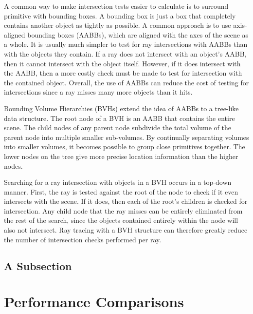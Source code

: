 \documentclass{sig-alternate}
\begin{document}
A common way to make intersection tests easier to calculate is to surround primitive with bounding boxes. A bounding box is just a box that completely contains another object as tightly as possible. A common approach is to use axis-aligned bounding boxes (AABBs), which are aligned with the axes of the scene as a whole. It is usually much simpler to test for ray intersections with AABBs than with the objects they contain. If a ray does not intersect with an object's AABB, then it cannot intersect with the object itself. However, if it does intersect with the AABB, then a more costly check must be made to test for intersection with the contained object. Overall, the use of AABBs can reduce the cost of testing for intersections since a ray misses many more objects than it hits.

Bounding Volume Hierarchies (BVHs) extend the idea of AABBs to a tree-like data structure. The root node of a BVH is an AABB that contains the entire scene. The child nodes of any parent node subdivide the total volume of the parent node into multiple smaller sub-volumes. By continually separating volumes into smaller volumes, it becomes possible to group close primitives together. The lower nodes on the tree give more precise location information than the higher nodes.

Searching for a ray intersection with objects in a BVH occurs in a top-down manner. First, the ray is tested against the root of the node to check if it even intersects with the scene. If it does, then each of the root's children is checked for intersection. Any child node that the ray misses can be entirely eliminated from the rest of the search, since the objects contained entirely within the node will also not intersect. Ray tracing with a BVH structure can therefore greatly reduce the number of intersection checks performed per ray.


\subsection{A Subsection}
\label{sec:subsection}


\section{Performance Comparisons}
\label{sec:performance}

\end{document}
